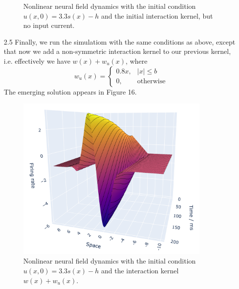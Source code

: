 \documentclass[12pt]{article}
\begin{document}
\begin{enumerate}
\begin{figure}[H]
    \caption{Nonlinear neural field dynamics with the initial condition $u(x, 0)=3.3s(x)-h$ and the initial interaction kernel, but no input current.}
\end{figure}
\item[2.5] Finally, we run the simulatiom with the same conditions as above, except that now we add a non-symmetric interaction kernel to our previous kernel, i.e.
effectively we have $w(x)+w_{u}(x)$, where
\[
    w_{u}(x)=\begin{cases}
        0.8x, & |x| \leq b\\
        0, & \text{otherwise}
    \end{cases} 
\] 
The emerging solution appears in Figure 16.
\begin{figure}[H]
    \centering
    \includegraphics[width=0.9\textwidth]{./figure16.png}
    \caption{Nonlinear neural field dynamics with the initial condition $u(x, 0)=3.3s(x)-h$ and the interaction kernel $w(x)+w_{u}(x)$.}
\end{figure}
\end{enumerate}
\end{document}
